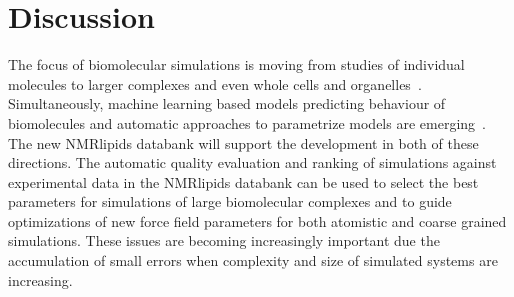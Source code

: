 \documentclass[fleqn,10pt]{wlscirep}
\begin{document}
\section{Discussion}


The focus of biomolecular simulations is moving from studies of individual molecules to larger complexes and even whole cells and organelles~\cite{johnson15,thornburg22,gupta22}. Simultaneously, machine learning based models predicting behaviour of biomolecules and automatic approaches to parametrize models are emerging~\cite{jumper21,antila22b}. The new NMRlipids databank will support the development in both of these directions. The automatic quality evaluation and ranking of simulations against experimental data in the NMRlipids databank can be used to select the best parameters for simulations of large biomolecular complexes and to guide optimizations of new force field parameters for both atomistic and coarse grained simulations. These issues are becoming increasingly important due the accumulation of small errors when complexity and size of simulated systems are increasing.
\end{document}
